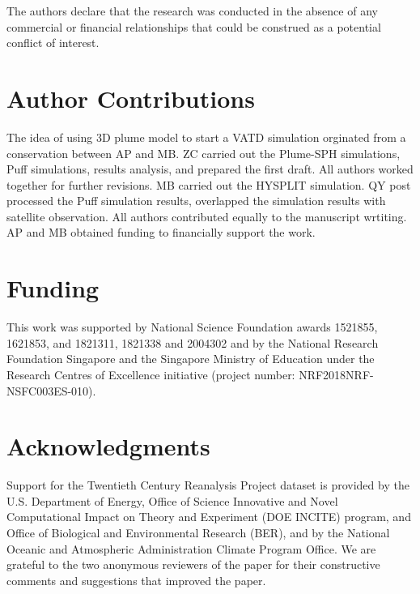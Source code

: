 \documentclass[utf8]{frontiersSCNS} %
\begin{document}
The authors declare that the research was conducted in the absence of any commercial or financial relationships that could be construed as a potential conflict of interest.

\section*{Author Contributions}
The idea of using 3D plume model to start a VATD simulation orginated from a conservation between AP and MB. ZC carried out the Plume-SPH simulations, Puff simulations, results analysis, and prepared the first draft. All authors worked together for further revisions.  MB carried out the HYSPLIT simulation. QY post processed the Puff simulation results, overlapped the simulation results with satellite observation. All authors contributed equally to the manuscript wrtiting. AP and MB obtained funding to financially support the work.

\section*{Funding}
This work was supported by National Science Foundation awards 1521855, 1621853, and 1821311, 1821338  and 2004302 and by the National Research Foundation Singapore and the Singapore Ministry of Education under the Research Centres of Excellence initiative (project number: NRF2018NRF-NSFC003ES-010). 

\section*{Acknowledgments}
Support for the Twentieth Century Reanalysis Project dataset is provided by the U.S. Department of Energy, Office of Science Innovative and Novel Computational Impact on Theory and Experiment (DOE INCITE) program, and Office of Biological and Environmental Research (BER), and by the National Oceanic and Atmospheric Administration Climate Program Office. We are grateful to the two anonymous reviewers of the paper for their constructive comments and suggestions that improved the paper.

\end{document}
